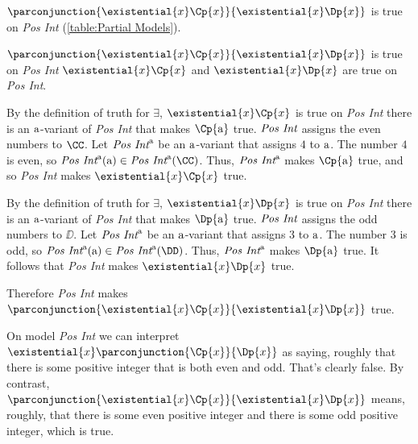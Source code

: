 \begin{majorILnc}{}
	$\parconjunction{\existential{\variable{x}}\Cp{\variable{x}}}{\existential{\variable{x}}\Dp{\variable{x}}}$ is true on \emph{Pos Int} (\ref{table:Partial Models}).
\end{majorILnc}
\begin{PROOF}
$\parconjunction{\existential{\variable{x}}\Cp{\variable{x}}}{\existential{\variable{x}}\Dp{\variable{x}}}$ is true on \emph{Pos Int} \Iff $\existential{\variable{x}}\Cp{\variable{x}}$ and $\existential{\variable{x}}\Dp{\variable{x}}$ are true on \emph{Pos Int}.

By the definition of truth for $\exists$, $\existential{\variable{x}}\Cp{\variable{x}}$ is true on \emph{Pos Int} \Iff there is an $\mathrm{a}$-variant of \emph{Pos Int} that makes $\Cp{\constant{a}}$ true.
$\emph{Pos Int}$ assigns the even numbers to $\CC$.
Let $\emph{Pos Int}^{\mathrm{a}}$ be an $\mathrm{a}$-variant that assigns $4$ to $\mathrm{a}$.
The number $4$ is even, so $\emph{Pos Int}^{\constant{a}}(\constant{a})\in\emph{Pos Int}^{\constant{a}}(\CC)$.
Thus, $\emph{Pos Int}^{\mathrm{a}}$ makes $\Cp{\constant{a}}$ true, and so \emph{Pos Int} makes $\existential{\variable{x}}\Cp{\variable{x}}$ true.

By the definition of truth for $\exists$, $\existential{\variable{x}}\Dp{\variable{x}}$ is true on \emph{Pos Int} \Iff there is an $\mathrm{a}$-variant of \emph{Pos Int} that makes $\Dp{\constant{a}}$ true.
$\emph{Pos Int}$ assigns the odd numbers to $\DD$.
Let $\emph{Pos Int}^{\mathrm{a}}$ be an $\mathrm{a}$-variant that assigns $3$ to $\mathrm{a}$.
The number $3$ is odd, so $\emph{Pos Int}^{\constant{a}}(\constant{a})\in\emph{Pos Int}^{\constant{a}}(\DD)$.
Thus, $\emph{Pos Int}^{\mathrm{a}}$ makes $\Dp{\constant{a}}$ true.
It follows that \emph{Pos Int} makes $\existential{\variable{x}}\Dp{\variable{x}}$ true.
	
Therefore \emph{Pos Int} makes $\parconjunction{\existential{\variable{x}}\Cp{\variable{x}}}{\existential{\variable{x}}\Dp{\variable{x}}}$ true.
\end{PROOF}

\noindent{}On model \emph{Pos Int} we can interpret $\existential{\variable{x}}\parconjunction{\Cp{\variable{x}}}{\Dp{\variable{x}}}$ as saying, roughly that there is some positive integer that is both even and odd.
That's clearly false.
By contrast, $\parconjunction{\existential{\variable{x}}\Cp{\variable{x}}}{\existential{\variable{x}}\Dp{\variable{x}}}$ means, roughly, that there is some even positive integer and there is some odd positive integer, which is true.

